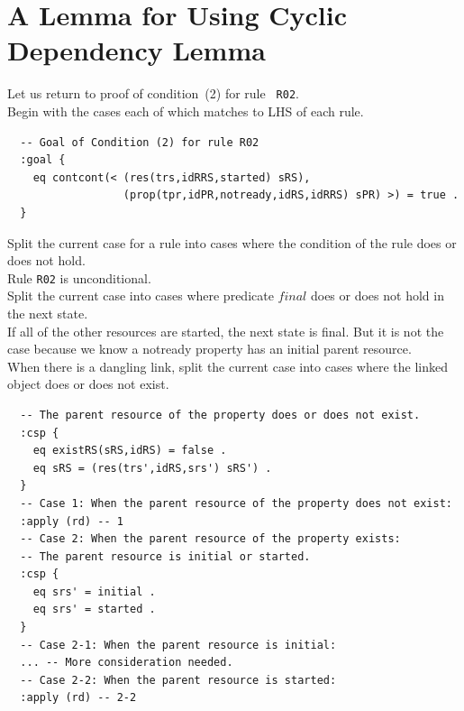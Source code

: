 \documentclass[12pt]{report}
\begin{document}
\section{A Lemma for Using Cyclic Dependency Lemma}
\label{sec:initialcont}
Let us return to proof of condition~(2) for rule {\tt
  R02}.\\

 Begin with the cases each of which matches to
LHS of each rule.
\small
\begin{verbatim}
  -- Goal of Condition (2) for rule R02
  :goal {
    eq contcont(< (res(trs,idRRS,started) sRS),
                  (prop(tpr,idPR,notready,idRS,idRRS) sPR) >) = true .
  }
\end{verbatim}
\normalsize
 Split the current case for a rule into
cases where the condition of the rule does or does not hold. \\
Rule {\tt R02} is unconditional.\\
 Split the current case into cases where
predicate $final$ does or does not hold in the next state.\\
If all of the other resources are started, the next state is final.
But it is not the case because we know a notready property has
an initial parent resource. \\
 When there is a dangling link, split the
current case into cases where the linked object does or does not
exist.
\small
\begin{verbatim}
  -- The parent resource of the property does or does not exist.
  :csp {
    eq existRS(sRS,idRS) = false .
    eq sRS = (res(trs',idRS,srs') sRS') .
  }
  -- Case 1: When the parent resource of the property does not exist:
  :apply (rd) -- 1
  -- Case 2: When the parent resource of the property exists:
  -- The parent resource is initial or started.
  :csp {
    eq srs' = initial .
    eq srs' = started .
  }
  -- Case 2-1: When the parent resource is initial:
  ... -- More consideration needed.
  -- Case 2-2: When the parent resource is started:
  :apply (rd) -- 2-2
\end{verbatim}
\normalsize
\end{document}
